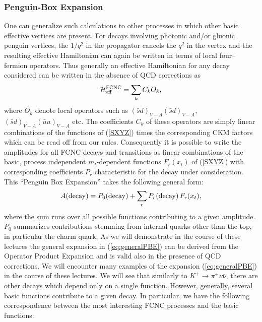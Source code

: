 \documentclass[12pt,rotate]{article}
\begin{document}
\begin{itemize}
\subsubsection{Penguin-Box Expansion}
One can generalize such calculations to other processes in which
other basic effective vertices are present. 
For decays involving photonic and/or gluonic penguin vertices, the
$1/q^2$ in the propagator cancels the $q^2$ in the vertex and the
resulting effective Hamiltonian can again be written in terms of local
four--fermion operators. Thus generally an effective Hamiltonian for
any decay considered can be written in the absence of QCD corrections
as
\begin{equation}\label{exp}
{\cal H}_{\rm eff}^{\rm FCNC}=\sum_k C_k O_k,
\end{equation}
where $O_k$ denote local operators such as $(\bar s d)_{V-A}(\bar s
d)_{V-A}$, $(\bar s d)_{V-A}(\bar uu)_{V-A}$ etc. The coefficients
$C_k$ of these operators are simply linear combinations of the
functions of (\ref{SXYZ}) times the corresponding 
CKM factors which can
be read off from our rules. Consequently it is possible to write
the amplitudes for all FCNC decays and transitions 
as linear combinations of the basic,   process independent
$m_t$-dependent functions $F_r(x_t)$ of (\ref{SXYZ}) with
corresponding coefficients $P_r$ characteristic for the decay under
consideration. 
This ``Penguin Box Expansion'' \cite{PBE0} takes
the following general form:
\begin{equation}
A({\rm decay}) = P_0({\rm decay}) + \sum_r P_r({\rm decay}) \, F_r(x_t),
\label{eq:generalPBE}
\end{equation}
where the sum runs over all possible functions contributing to a given
amplitude. 
$P_0$  summarizes contributions stemming from internal quarks
other than the top, in particular the charm quark. As we will
demonstrate in the course of these lectures the general expansion
in (\ref{eq:generalPBE}) can be derived from the Operator Product
Expansion and is valid also in the presence of QCD corrections.
We will encounter many
examples of the expansion (\ref{eq:generalPBE}) in the course of 
these lectures.
We will see that similarly to $K^+\to\pi^+\nu\bar\nu$, there are other
decays which depend only on a single function. However, generally,
several basic functions contribute to a given decay. In particular,
we have the following correspondence between the most interesting FCNC
processes and the basic functions:


\end{itemize}
\end{document}
